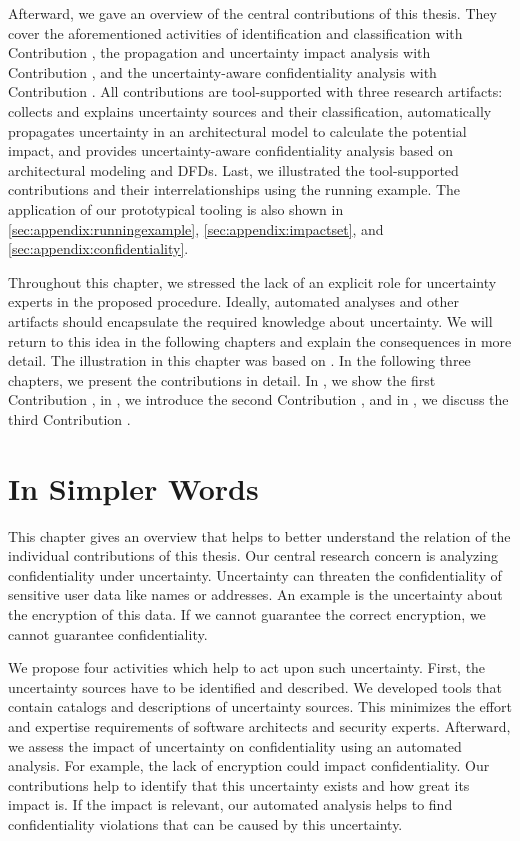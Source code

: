 Afterward, we gave an overview of the central contributions of this thesis.
They cover the aforementioned activities of identification and classification with Contribution , the propagation and uncertainty impact analysis with Contribution , and the uncertainty-aware confidentiality analysis with Contribution .
All contributions are tool-supported with three research artifacts: \arcen collects and explains uncertainty sources and their classification, \uia automatically propagates uncertainty in an architectural model to calculate the potential impact, and \abunai provides uncertainty-aware confidentiality analysis based on architectural modeling and \acp{DFD}.
Last, we illustrated the tool-supported contributions and their interrelationships using the running example.
The application of our prototypical tooling is also shown in \autoref{sec:appendix:runningexample}, \autoref{sec:appendix:impactset}, and \autoref{sec:appendix:confidentiality}.

Throughout this chapter, we stressed the lack of an explicit role for uncertainty experts in the proposed procedure.
Ideally, automated analyses and other artifacts should encapsulate the required knowledge about uncertainty.
We will return to this idea in the following chapters and explain the consequences in more detail.
The illustration in this chapter was based on .
In the following three chapters, we present the contributions in detail.
In , we show the first Contribution , in , we introduce the second Contribution , and in , we discuss the third Contribution .





\section{In Simpler Words}%
\label{sec:overview:simple}

This chapter gives an overview that helps to better understand the relation of the individual contributions of this thesis.
Our central research concern is analyzing confidentiality under uncertainty.
Uncertainty can threaten the confidentiality of sensitive user data like names or addresses.
An example is the uncertainty about the encryption of this data.
If we cannot guarantee the correct encryption, we cannot guarantee confidentiality.

We propose four activities which help to act upon such uncertainty.
First, the uncertainty sources have to be identified and described.
We developed tools that contain catalogs and descriptions of uncertainty sources.
This minimizes the effort and expertise requirements of software architects and security experts.
Afterward, we assess the impact of uncertainty on confidentiality using an automated analysis.
For example, the lack of encryption could impact confidentiality.
Our contributions help to identify that this uncertainty exists and how great its impact is.
If the impact is relevant, our automated analysis helps to find confidentiality violations that can be caused by this uncertainty.